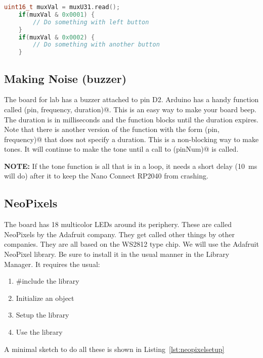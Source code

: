 \begin{lstlisting}[language=C++, caption={The buttons attached to the PCA9535 can be accessed 
    as shown in this code snippet.},label={lst:muxButtons}]
    uint16_t muxVal = muxU31.read();
    if(muxVal & 0x0001) {
        // Do something with left button
    }
    if(muxVal & 0x0002) {
        // Do something with another button
    }
\end{lstlisting}



\subsection{Making Noise (buzzer)}
The board for lab has a buzzer attached to pin D2. Arduino has a handy function called 
\lstinline@tone(pin, frequency, duration)@. This is an easy way to make your board beep.
The duration is in milliseconds and the function blocks until the duration expires. Note 
that there is another version of the function with the form 
\lstinline@tone(pin, frequency)@ that does not specify a duration. This is a non-blocking
way to make tones. It will continue to make the tone until a call to \lstinline@noTone(pinNum)@
is called. 

\textbf{NOTE:} If the tone function is all that is in a loop, it needs a short delay (10~ms will do)
after it to keep the Nano Connect RP2040 from crashing.

\subsection{NeoPixels}
The board has 18 multicolor LEDs around its periphery. These are called NeoPixels by the 
Adafruit company. They get called other things by other companies. They are all based on 
the WS2812 type chip. We will use the Adafruit NeoPixel library. Be sure to install it 
in the usual manner in the Library Manager. It requires the usual:
\begin{enumerate}
    \item \#include the library
    \item Initialize an object
    \item Setup the library
    \item Use the library
\end{enumerate}
A minimal sketch to do all these is shown in Listing~\ref{lst:neopixelsetup}

